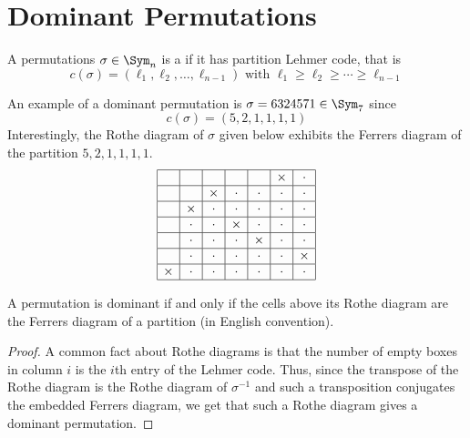 \documentclass[11pt,leqno,oneside]{amsart}
\numberwithin{thm}{section}
\begin{document}
 \section{Dominant Permutations}
 \begin{defn}
   A permutations \(\sigma \in \Sym_n\) is a 
   if it has partition Lehmer code, that is \[
     c(\sigma) = (\ell_1, \ell_2, \ldots, \ell_{n-1}) \text{ with }
     \ell_1 \geq \ell_2 \geq \cdots \geq \ell_{n-1}
   \]
 \end{defn}
 \begin{example}
   An example of a dominant permutation is \(\sigma = 6324571 \in \Sym_7\)
   since \[
     c(\sigma) = (5,2,1,1,1,1)
   \]
   Interestingly, the Rothe diagram of \(\sigma\) given below exhibits
   the Ferrers diagram of the partition \(5,2,1,1,1,1\). \[
     \begin{array}{|c|c|c|c|c|c|c|} \hline &&&&&\times&\cdot\\ \hline &&\times&\cdot&\cdot&\cdot&\cdot\\ \hline &\times&\cdot&\cdot&\cdot&\cdot&\cdot\\ \hline &\cdot&\cdot&\times&\cdot&\cdot&\cdot\\ \hline &\cdot&\cdot&\cdot&\times&\cdot&\cdot\\ \hline &\cdot&\cdot&\cdot&\cdot&\cdot&\times\\ \hline \times&\cdot&\cdot&\cdot&\cdot&\cdot&\cdot\\ \hline \end{array}
   \]
 \end{example}
 \begin{prop}
   A permutation is dominant if and only if the cells above its Rothe
   diagram are the Ferrers diagram of a partition (in English
   convention). 
 \end{prop}
\begin{proof}
  A common fact about Rothe diagrams is that the number of empty boxes
  in column \(i\) is the \(i\)th entry of the Lehmer code. Thus, since
  the transpose of the Rothe diagram is the Rothe diagram of
  \(\sigma^{-1}\) and such a transposition conjugates the embedded Ferrers
  diagram, we get that such a Rothe diagram gives a dominant
  permutation.

\end{proof}
\end{document}
